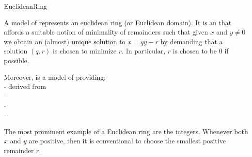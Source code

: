 \begin{ccRefConcept}{EuclideanRing}


\ccDefinition

A model of  represents an euclidean ring (or Euclidean domain). 
It is an  that affords a suitable notion of minimality of remainders 
such that given $x$ and $y \neq 0$ we obtain an (almost) unique solution to 
$ x = qy + r $ by demanding that a solution $(q,r)$ is chosen to minimize $r$. 
In particular, $r$ is chosen to be $0$ if possible.

Moreover,  is a model of 
 providing:\\
 
-  derived from  \\
-  \\
-  \\
- \\





The most prominent example of a Euclidean ring are the integers. 
Whenever both $x$ and $y$ are positive, then it is conventional to choose 
the smallest positive remainder $r$. 




\ccRefines

\ccSeeAlso

\\
\\
\\
\\
\\
\\
\\
\\
\\


\end{ccRefConcept}
